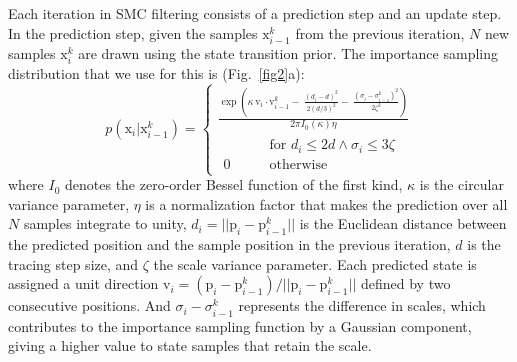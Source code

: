 Each iteration in SMC filtering consists of a prediction step and an update step. In the prediction step, given the samples $\mathrm{x}_{i-1}^k$ from the previous iteration, $N$ new samples $\mathrm{x}_i^k$ are drawn using the state transition prior. The importance sampling distribution that we use for this is (Fig.~\ref{fig2}a):
\begin{equation}
p(\mathrm{x}_i  | \mathrm{x}_{i-1}^k) =
\begin{cases}
\displaystyle\frac{\exp\left(\kappa\,\mathrm{v}_i \cdot \mathrm{v}_{i-1}^k -\ \frac{(d_i-d)^2}{2 (d/3)^2} -\ \frac{(\sigma_i-\sigma_{i-1}^k)^2}{2\zeta^2} \right)}{2 \pi I_0(\kappa)\eta} \\[2ex]
\begin{aligned}
& \qquad\text{for $d_i \leq 2d \land \sigma_i \leq 3\zeta$} \\
0 & \qquad\text{otherwise}
\end{aligned}
\end{cases}
\label{eq:pred}
\end{equation}
where $I_0$ denotes the zero-order Bessel function of the first kind, $\kappa$ is the circular variance parameter, $\eta$ is a normalization factor that makes the prediction over all $N$ samples integrate to unity, $d_i= || \mathrm{p}_i - \mathrm{p}_{i-1}^k ||$ is the Euclidean distance between the predicted position and the sample position in the previous iteration, $d$ is the tracing step size, and $\zeta$ the scale variance parameter. Each predicted state is assigned a unit direction $\mathrm{v}_i = (\mathrm{p}_i - \mathrm{p}_{i-1}^k) / || \mathrm{p}_i - \mathrm{p}_{i-1}^k ||$ defined by two consecutive positions. And $\sigma_i-\sigma_{i-1}^k$ represents the difference in scales, which contributes to the importance sampling function by a Gaussian component, giving a higher value to state samples that retain the scale.

